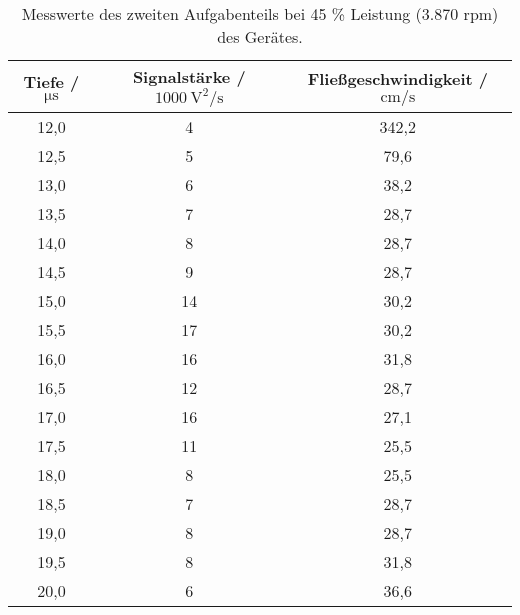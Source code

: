 \begin{table}[H]
  \centering
  \caption{Messwerte des zweiten Aufgabenteils bei 45 \% Leistung (3.870 rpm) des Gerätes.}
  \label{tab:Werte2}
  \begin{tabular}{c c c}
    \toprule
    Tiefe / $\si{\micro\second}$ & Signalstärke / $\SI{1000}{\square\volt\per\second}$ & Fließgeschwindigkeit / $\si{\centi\meter\per\second}$ \\
    \midrule
    12,0 & 4 & 342,2 \\
    12,5 & 5 & 79,6 \\
    13,0 & 6 & 38,2 \\
    13,5 & 7 & 28,7 \\
    14,0 & 8 & 28,7 \\
    14,5 & 9 & 28,7 \\
    15,0 & 14 & 30,2 \\
    15,5 & 17 & 30,2 \\
    16,0 & 16 & 31,8 \\
    16,5 & 12 & 28,7 \\
    17,0 & 16 & 27,1 \\
    17,5 & 11 & 25,5 \\
    18,0 & 8 & 25,5 \\
    18,5 & 7 & 28,7 \\
    19,0 & 8 & 28,7 \\
    19,5 & 8 & 31,8 \\
    20,0 & 6 & 36,6 \\
    \bottomrule
  \end{tabular}
\end{table}